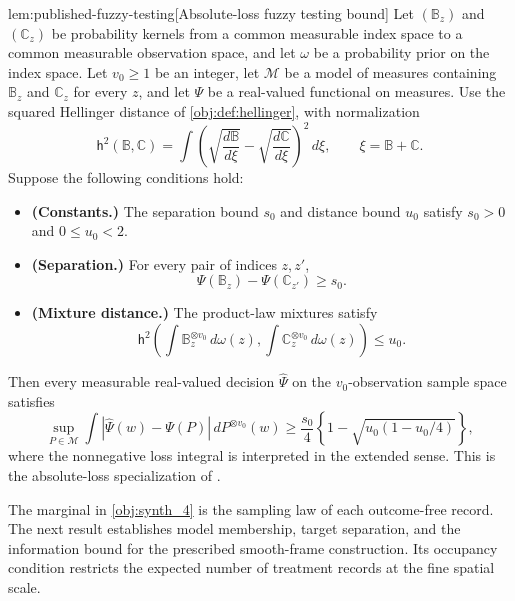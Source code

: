 \begin{lemmav}{lem:published-fuzzy-testing}[Absolute-loss fuzzy testing bound]
Let \((\mathbb B_z)\) and \((\mathbb C_z)\) be probability kernels from a common measurable index space to a common measurable observation space, and let \(\omega\) be a probability prior on the index space. Let \(v_0\ge1\) be an integer, let \(\mathcal M\) be a model of measures containing \(\mathbb B_z\) and \(\mathbb C_z\) for every \(z\), and let \(\Psi\) be a real-valued functional on measures. Use the squared Hellinger distance of \cref{obj:def:hellinger}, with normalization
\[
\mathsf h^2(\mathbb B,\mathbb C)
=
\int
\left(
\sqrt{\frac{d\mathbb B}{d\xi}}
-
\sqrt{\frac{d\mathbb C}{d\xi}}
\right)^2\,d\xi,
\qquad
\xi=\mathbb B+\mathbb C.
\]
Suppose the following conditions hold:
\begin{itemize}
\item \textbf{(Constants.)} The separation bound \(s_0\) and distance bound \(u_0\) satisfy \(s_0>0\) and \(0\le u_0<2\).
\item \textbf{(Separation.)} For every pair of indices \(z,z'\),
\[
\Psi(\mathbb B_z)-\Psi(\mathbb C_{z'})\ge s_0.
\]
\item \textbf{(Mixture distance.)} The product-law mixtures satisfy
\[
\mathsf h^2\left(
\int \mathbb B_z^{\otimes v_0}\,d\omega(z),
\int \mathbb C_z^{\otimes v_0}\,d\omega(z)
\right)\le u_0.
\]
\end{itemize}
Then every measurable real-valued decision \(\widehat\Psi\) on the \(v_0\)-observation sample space satisfies
\[
\sup_{P\in\mathcal M}
\int
\left|\widehat\Psi(w)-\Psi(P)\right|
\,dP^{\otimes v_0}(w)
\ge
\frac{s_0}{4}
\left\{1-\sqrt{u_0(1-u_0/4)}\right\},
\]
where the nonnegative loss integral is interpreted in the extended sense. This is the absolute-loss specialization of \citep[Section 3, Lemma 1]{KennedyBalakrishnanRobinsWasserman2024}.
\end{lemmav}

The marginal in \cref{obj:synth_4} is the sampling law of each outcome-free record. The next result establishes model membership, target separation, and the information bound for the prescribed smooth-frame construction. Its occupancy condition restricts the expected number of treatment records at the fine spatial scale.

